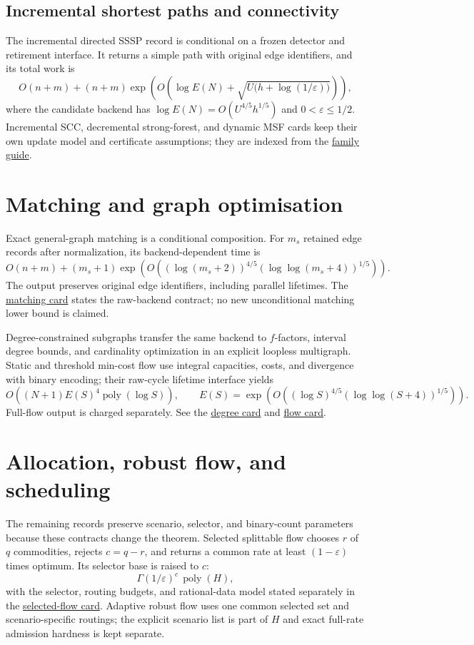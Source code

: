 \documentclass[10pt,a4paper]{article}
\newcommand{\repo}[2]{\href{https://github.com/icekylinx/algorithm-frontier/#1}{#2}}
\newcommand{\poly}{\operatorname{poly}}
\newcommand{\eps}{\varepsilon}
\theoremstyle{recordstyle}
\begin{document}
\subsection{Incremental shortest paths and connectivity}
The incremental directed SSSP record is conditional on a frozen detector and
retirement interface.  It returns a simple path with original edge identifiers,
and its total work is
\[
 O(n+m)+(n+m)\exp\!\left(O\!\left(\log E(N)+
 \sqrt{U\bigl(h+\log(1/\eps)\bigr)}\right)\right),
\]
where the candidate backend has $\log E(N)=O(U^{4/5}h^{1/5})$ and
$0<\eps\leq 1/2$.  Incremental SCC, decremental strong-forest, and dynamic
MSF cards keep their own update model and certificate assumptions; they are
indexed from the \repo{docs/FAMILIES.md}{family guide}.

\section{Matching and graph optimisation}
Exact general-graph matching is a conditional composition.  For $m_s$ retained
edge records after normalization, its backend-dependent time is
\[
 O(n+m)+(m_s+1)\exp\!\left(O\!\left((\log(m_s+2))^{4/5}
 (\log\log(m_s+4))^{1/5}\right)\right).
\]
The output preserves original edge identifiers, including parallel lifetimes.
The \repo{problems/general-matching/}{matching card} states the raw-backend
contract; no new unconditional matching lower bound is claimed.

Degree-constrained subgraphs transfer the same backend to $f$-factors,
interval degree bounds, and cardinality optimization in an explicit loopless
multigraph.  Static and threshold min-cost flow use integral capacities, costs,
and divergence with binary encoding; their raw-cycle lifetime interface yields
\[
 O((N+1)E(S)^4\poly(\log S)),
 \qquad E(S)=\exp\!\left(O((\log S)^{4/5}
 (\log\log(S+4))^{1/5})\right).
\]
Full-flow output is charged separately.  See the
\repo{problems/degree-constrained-subgraphs/}{degree card} and
\repo{problems/min-cost-flow/}{flow card}.

\section{Allocation, robust flow, and scheduling}
The remaining records preserve scenario, selector, and binary-count parameters
because these contracts change the theorem.  Selected splittable flow chooses
$r$ of $q$ commodities, rejects $c=q-r$, and returns a common rate at least
$(1-\eps)$ times optimum.  Its selector base is raised to $c$:
\[
  \Gamma(1/\eps)^c\,\poly(H),
\]
with the selector, routing budgets, and rational-data model stated separately
in the \repo{problems/selected-flow/}{selected-flow card}.  Adaptive robust flow
uses one common selected set and scenario-specific routings; the explicit
scenario list is part of $H$ and exact full-rate admission hardness is kept
separate.
\end{document}
